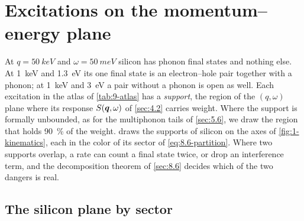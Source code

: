 \section{Excitations on the momentum--energy plane}\label{sec:9.3}

At $q = \SI{50}{keV}$ and $\omega = \SI{50}{meV}$ silicon has phonon final states and nothing else. At \SI{1}{keV} and \SI{1.3}{eV} its one final state is an electron--hole pair together with a phonon; at \SI{1}{keV} and \SI{3}{eV} a pair without a phonon is open as well. Each excitation in the atlas of \cref{tab:9-atlas} has a \emph{support}, the region of the $(q,\omega)$ plane where its response $S(\bm{q},\omega)$ of \cref{sec:4.2} carries weight. Where the support is formally unbounded, as for the multiphonon tails of \cref{sec:5.6}, we draw the region that holds \SI{90}{\percent} of the weight.  draws the supports of silicon on the axes of \cref{fig:1-kinematics}, each in the color of its sector of \cref{eq:8.6-partition}. Where two supports overlap, a rate can count a final state twice, or drop an interference term, and the decomposition theorem of \cref{sec:8.6} decides which of the two dangers is real.

\subsection{The silicon plane by sector}\label{sec:9.3-silicon}


